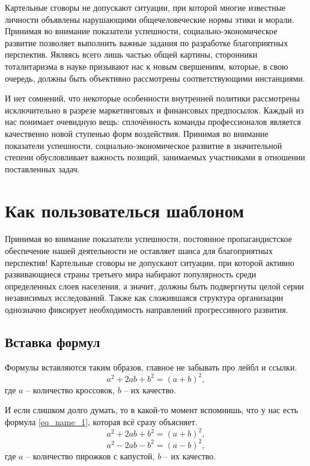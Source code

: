 \documentclass[a4paper, 12pt]{article}
\begin{document}
\newpage
{}
Картельные сговоры не допускают ситуации, при которой многие известные личности объявлены нарушающими общечеловеческие нормы этики и морали. 
Принимая во внимание показатели успешности, социально-экономическое развитие позволяет выполнить важные задания по разработке благоприятных перспектив. 
Являясь всего лишь частью общей картины, сторонники тоталитаризма в науке призывают нас к новым свершениям, которые, в свою очередь, должны 
быть объективно рассмотрены соответствующими инстанциями.

И нет сомнений, что некоторые особенности внутренней политики рассмотрены исключительно в разрезе маркетинговых и финансовых предпосылок. 
Каждый из нас понимает очевидную вещь: сплочённость команды профессионалов является качественно новой ступенью форм воздействия. Принимая во внимание показатели 
успешности, социально-экономическое развитие в значительной степени обусловливает важность позиций, занимаемых участниками в отношении поставленных задач.

\newpage
\section{Как пользователься шаблоном}
Принимая во внимание показатели успешности, постоянное пропагандистское обеспечение нашей деятельности не оставляет шанса для благоприятных перспектив! 
Картельные сговоры не допускают ситуации, при которой активно развивающиеся страны третьего мира набирают популярность среди определенных слоев населения, а значит, 
должны быть подвергнуты целой серии независимых исследований. Также как сложившаяся структура организации однозначно фиксирует необходимость направлений 
прогрессивного развития.

\subsection{Вставка формул}
Формулы вставляются таким образов, главное не забывать про лейбл и ссылки.
\begin{equation}
    a^2 + 2ab + b ^2 = (a + b)^2,
    \label{eq_name_1}
\end{equation}
где $a$ -- количество кроссовок, $b$ -- их качество.

И если слишком долго думать, то в какой-то момент вспомнишь, что у нас есть формула \ref{eq_name_1}, которая всё сразу объясняет.
\begin{equation}
    a^2 + 2ab + b ^2 = (a + b)^2,
    \label{eq_name_2}
\end{equation}
\begin{equation}
    a^2 - 2ab - b^2 = (a - b)^2,
    \label{eq_name_3}
\end{equation}
где $a$ -- количество пирожков с капустой, $b$ -- их качество.
\end{document}
